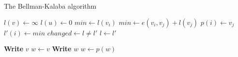 \documentclass[11pt, a4paper]{article}
\begin{document}
\begin{algorithm}
\label{alg:ex1}
\caption{The Bellman-Kalaba algorithm}
    \begin{algorithmic}[1]
            \State $l(v) \leftarrow \infty$
        \EndFor
        \State $l(u) \leftarrow 0$
        \Repeat
                \State $min \leftarrow l(v_i)$
                        \State $min \leftarrow e(v_i, v_j) + l(v_j)$
                        \State $p(i) \leftarrow v_j$
                    \EndIf
                \EndFor
                \State $l'(i) \leftarrow min$
            \EndFor
            \State $changed \leftarrow l \not= l'$
            \State $l \leftarrow l'$
    \EndProcedure
    
    \Statex
            \State \textbf{Write} $v$
        \Else
            \State $w \leftarrow v$
                \State \textbf{Write} $w$
                \State $w \leftarrow p(w)$
            \EndWhile
        \EndIf
    \EndProcedure
    \end{algorithmic}
\end{algorithm}
\end{document}
